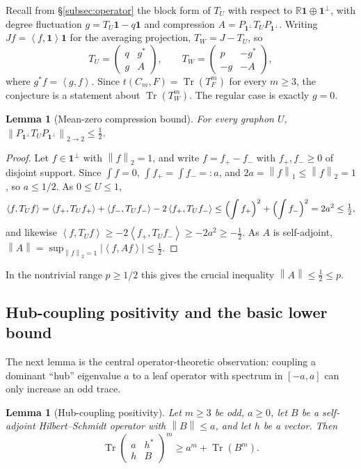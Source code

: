 \documentclass[11pt]{article}
\newtheorem{lemma}[theorem]{Lemma}
\newcommand{\one}{\mathbf 1}
\newcommand{\ip}[2]{\left\langle #1,#2\right\rangle}
\newcommand{\Tr}{\operatorname{Tr}}
\newcommand{\norm}[1]{\left\|#1\right\|}
\begin{document}
Recall from \S\ref{subsec:operator} the block form of $T_U$ with respect to $\mathbb R\one\oplus\one^\perp$, with degree fluctuation $g=T_U\one-q\one$ and compression $A=P_{\one^\perp}T_UP_{\one^\perp}$.  Writing $Jf=\ip{f}{\one}\one$ for the averaging projection, $T_W=J-T_U$, so
\begin{equation}\label{eq:block-TW}
        T_U=\begin{pmatrix} q & g^*\\ g & A\end{pmatrix},
        \qquad
        T_W=\begin{pmatrix} p & -g^*\\ -g & -A\end{pmatrix},
\end{equation}
where $g^*f=\ip{g}{f}$.  Since $t(C_m,F)=\Tr(T_F^m)$ for every $m\ge3$, the conjecture is a statement about $\Tr(T_W^m)$.  The regular case is exactly $g=0$.

\begin{lemma}[Mean-zero compression bound]\label{lem:compression}
For every graphon $U$, $\norm{P_{\one^\perp}T_UP_{\one^\perp}}_{2\to2}\le\tfrac12$.
\end{lemma}

\begin{proof}
Let $f\in\one^\perp$ with $\norm f_2=1$, and write $f=f_+-f_-$ with $f_+,f_-\ge0$ of disjoint support.  Since $\int f=0$, $\int f_+=\int f_-=:a$, and $2a=\norm f_1\le\norm f_2=1$, so $a\le1/2$.  As $0\le U\le1$,
\[
        \ip{f}{T_Uf}=\ip{f_+}{T_Uf_+}+\ip{f_-}{T_Uf_-}-2\ip{f_+}{T_Uf_-}
        \le\Bigl(\int f_+\Bigr)^2+\Bigl(\int f_-\Bigr)^2=2a^2\le\tfrac12,
\]
and likewise $\ip{f}{T_Uf}\ge-2\ip{f_+}{T_Uf_-}\ge-2a^2\ge-\tfrac12$.  As $A$ is self-adjoint, $\norm A=\sup_{\norm f_2=1}|\ip{f}{Af}|\le\tfrac12$.
\end{proof}

In the nontrivial range $p\ge1/2$ this gives the crucial inequality $\norm A\le\tfrac12\le p$.

\subsection{Hub-coupling positivity and the basic lower bound}

The next lemma is the central operator-theoretic observation: coupling a dominant ``hub'' eigenvalue $a$ to a leaf operator with spectrum in $[-a,a]$ can only increase an odd trace.

\begin{lemma}[Hub-coupling positivity]\label{lem:hub}
Let $m\ge3$ be odd, $a\ge0$, let $B$ be a self-adjoint Hilbert--Schmidt operator with $\norm B\le a$, and let $h$ be a vector.  Then
\[
        \Tr\begin{pmatrix} a & h^*\\ h & B\end{pmatrix}^m\ge a^m+\Tr(B^m).
\]
\end{lemma}
\end{document}
